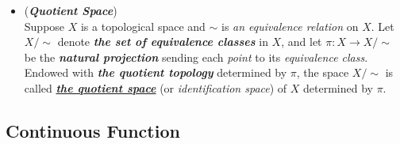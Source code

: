 \documentclass[11pt]{article}
\begin{document}
\begin{itemize}
\item \begin{definition}(\emph{\textbf{Quotient Space}})\\
Suppose $X$ is a topological space and $\sim$ is \emph{an equivalence relation} on $X$. Let $X/\sim$ denote \emph{\textbf{the set of equivalence classes}} in $X$, and let $\pi: X \rightarrow X/\sim$ be the \emph{\textbf{natural projection}} sending each \emph{point} to its \emph{equivalence class}. Endowed with \emph{\textbf{the quotient topology}} determined by $\pi$, the space $X/\sim$ is called \underline{\emph{\textbf{the quotient space}}} (or \emph{identification space}) of $X$ determined by $\pi$.
\end{definition}
\end{itemize}

\subsection{Continuous Function}
\end{document}
